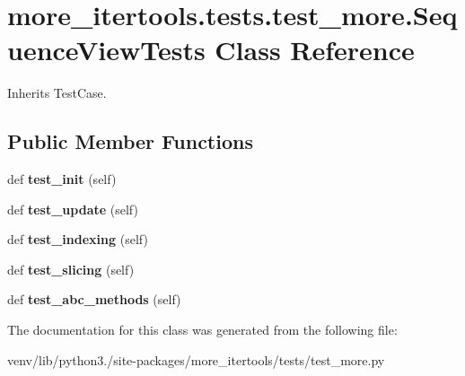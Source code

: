 \hypertarget{classmore__itertools_1_1tests_1_1test__more_1_1_sequence_view_tests}{}\section{more\+\_\+itertools.\+tests.\+test\+\_\+more.\+Sequence\+View\+Tests Class Reference}
\label{classmore__itertools_1_1tests_1_1test__more_1_1_sequence_view_tests}


Inherits Test\+Case.

\subsection*{Public Member Functions}
\begin{DoxyCompactItemize}
\item 
\mbox{\label{classmore__itertools_1_1tests_1_1test__more_1_1_sequence_view_tests_add80d9260bfdab29128d770c0fc986f7}} 
def {\bfseries test\+\_\+init} (self)
\item 
\mbox{\label{classmore__itertools_1_1tests_1_1test__more_1_1_sequence_view_tests_a895cac1303321d8e4cad6261081f3247}} 
def {\bfseries test\+\_\+update} (self)
\item 
\mbox{\label{classmore__itertools_1_1tests_1_1test__more_1_1_sequence_view_tests_a6c8e850de96a4338bac9cdebf0b5e7de}} 
def {\bfseries test\+\_\+indexing} (self)
\item 
\mbox{\label{classmore__itertools_1_1tests_1_1test__more_1_1_sequence_view_tests_a5d8ff96f70a8666b87e846e2ca0427d7}} 
def {\bfseries test\+\_\+slicing} (self)
\item 
\mbox{\label{classmore__itertools_1_1tests_1_1test__more_1_1_sequence_view_tests_a4e535f1ff8e43ce79d8df73048d1fd42}} 
def {\bfseries test\+\_\+abc\+\_\+methods} (self)
\end{DoxyCompactItemize}


The documentation for this class was generated from the following file\+:\begin{DoxyCompactItemize}
\item 
venv/lib/python3./site-\/packages/more\+\_\+itertools/tests/test\+\_\+more.\+py\end{DoxyCompactItemize}
